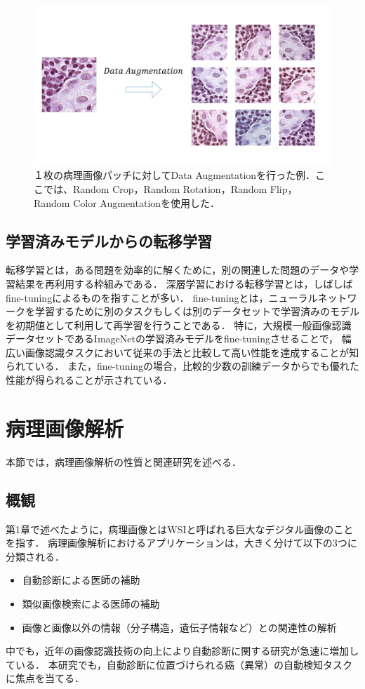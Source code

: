 \begin{figure}[tbp]
     \begin{center}
      \includegraphics[width=12cm]{figures/data_augmentation.pdf}
     \end{center}
    \caption{\label{fig:data_augmentation}１枚の病理画像パッチに対してData Augmentationを行った例．ここでは、Random Crop，Random Rotation，Random Flip，Random Color Augmentationを使用した．}
\end{figure}

\subsection{学習済みモデルからの転移学習}
\label{sec:transfer}
転移学習とは，ある問題を効率的に解くために，別の関連した問題のデータや学習結果を再利用する枠組みである．
深層学習における転移学習とは，しばしばfine-tuningによるものを指すことが多い．
fine-tuningとは，ニューラルネットワークを学習するために別のタスクもしくは別のデータセットで学習済みのモデルを初期値として利用して再学習を行うことである．
特に，大規模一般画像認識データセットであるImageNet\cite{imagenet_cvpr09}の学習済みモデルをfine-tuningさせることで，
幅広い画像認識タスクにおいて従来の手法と比較して高い性能を達成することが知られている\cite{girshick2014rich, agrawal2014analyzing}．
また，fine-tuningの場合，比較的少数の訓練データからでも優れた性能が得られることが示されている．

\section{病理画像解析}
本節では，病理画像解析の性質と関連研究を述べる．

\subsection{概観}
第1章で述べたように，病理画像とはWSIと呼ばれる巨大なデジタル画像のことを指す．
病理画像解析におけるアプリケーションは，大きく分けて以下の3つに分類される\cite{komuraishikawa}．
\begin{itemize}
    \item 自動診断による医師の補助
    \item 類似画像検索による医師の補助
    \item 画像と画像以外の情報（分子構造，遺伝子情報など）との関連性の解析
\end{itemize}
中でも，近年の画像認識技術の向上により自動診断に関する研究が急速に増加している\cite{doyle2008automated,dundar2011computerized}．
本研究でも，自動診断に位置づけられる癌（異常）の自動検知タスクに焦点を当てる．

